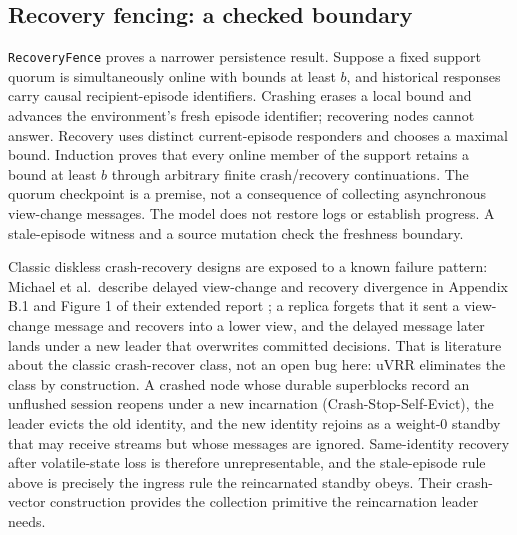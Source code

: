 \documentclass[10pt,journal,letterpaper]{IEEEtran}
\begin{document}
\subsection{Recovery fencing: a checked boundary}
\texttt{RecoveryFence} proves a narrower persistence result. Suppose a fixed
support quorum is simultaneously online with bounds at least $b$, and
historical responses carry causal recipient-episode identifiers. Crashing
erases a local bound and advances the environment's fresh episode identifier;
recovering nodes cannot answer. Recovery uses distinct current-episode
responders and chooses a maximal bound. Induction proves that every online
member of the support retains a bound at least $b$ through arbitrary finite
crash/recovery continuations. The quorum checkpoint is a premise, not a
consequence of collecting asynchronous view-change messages. The model does
not restore logs or establish progress. A stale-episode witness and a source
mutation check the freshness boundary.

Classic diskless crash-recovery designs are exposed to a known failure
pattern: Michael et al.\ describe delayed view-change and recovery
divergence in Appendix B.1 and Figure 1 of their extended report
\cite{diskless,recovery}; a replica forgets that it sent a view-change
message and recovers into a lower view, and the delayed message later lands
under a new leader that overwrites committed decisions. That is literature
about the classic
crash-recover class, not an open bug here: uVRR eliminates the class by
construction. A crashed node whose durable superblocks record an unflushed
session reopens under a new incarnation (Crash-Stop-Self-Evict), the leader
evicts the old identity, and the new identity rejoins as a weight-0 standby
that may receive streams but whose messages are ignored. Same-identity
recovery after volatile-state loss is therefore unrepresentable, and the
stale-episode rule above is precisely the ingress rule the reincarnated
standby obeys. Their crash-vector construction provides the collection
primitive the reincarnation leader needs.
\end{document}
